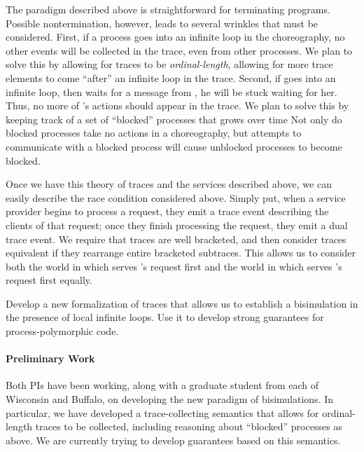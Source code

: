 The paradigm described above is straightforward for terminating programs.
Possible nontermination, however, leads to several wrinkles that must be considered.
First, if a process goes into an infinite loop in the choreography, no other events will be collected in the trace, even from other processes.
We plan to solve this by allowing for traces to be \emph{ordinal-length}, allowing for more trace elements to come ``after'' an infinite loop in the trace.
Second, if \Alice{} goes into an infinite loop, then \Bob{} waits for a message from \Alice, he will be stuck waiting for her.
Thus, no more of \Bob{}'s actions should appear in the trace.
We plan to solve this by keeping track of a set of ``blocked'' processes that grows over time
Not only do blocked processes take no actions in a choreography, but attempts to communicate with a blocked process will cause unblocked processes to become blocked.

Once we have this theory of traces and the services described above, we can easily describe the race condition considered above.
Simply put, when a service provider begins to process a request, they emit a trace event describing the clients of that request; once they finish processing the request, they emit a dual trace event.
We require that traces are well bracketed, and then consider traces equivalent if they rearrange entire bracketed subtraces.
This allows us to consider both the world in which \Alice{} serves \Bob{}'s request first and the world in which \Alice{} serves \Cathy{}'s request first equally.

\begin{goal}
  \label{goal:strong-epp}
  Develop a new formalization of traces that allows us to establish a bisimulation in the presence of local infinite loops.
  Use it to develop strong guarantees for process-polymorphic code.
\end{goal}
\fi

\paragraph{Preliminary Work}
Both PIs have been working, along with a graduate student from each of Wisconsin and Buffalo, on developing the new paradigm of bisimulations.
In particular, we have developed a trace-collecting semantics that allows for ordinal-length traces to be collected, including reasoning about ``blocked'' processes as above.
We are currently trying to develop guarantees based on this semantics.


